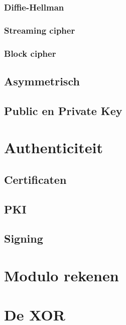\documentclass[a4paper,12pt,twoside,openright,titlepage]{book}
\begin{document}
\subsection{Diffie-Hellman}

\subsection{Streaming cipher}


\subsection{Block cipher}



\section{Asymmetrisch}

\section{Public en Private Key}


\chapter{Authenticiteit}

\section{Certificaten}

\section{PKI}

\section{Signing}


\begin{appendices}
	\chapter{Modulo rekenen}\label{chap:modulo}

	\chapter{De XOR}\label{chap:xor}

\end{appendices}

\printindex
\end{document}

